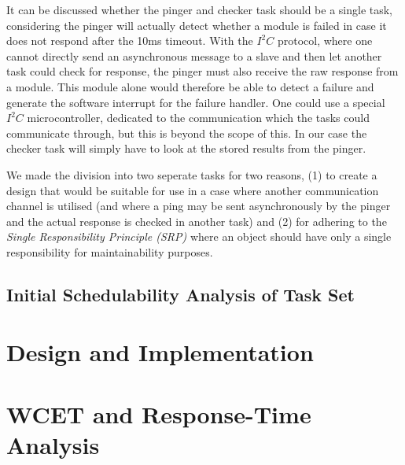 It can be discussed whether the pinger and checker task should be a single task, considering the pinger will actually detect whether a module is failed in case it does not respond after the 10ms timeout. With the $\textit{I}^2\textit{C}$ protocol, where one cannot directly send an asynchronous message to a slave and then let another task could check for response, the pinger must also receive the raw response from a module. This module alone would therefore be able to detect a failure and generate the software interrupt for the failure handler. One could use a special $\textit{I}^2\textit{C}$ microcontroller, dedicated to the communication which the tasks could communicate through, but this is beyond the scope of this. In our case the checker task will simply have to look at the stored results from the pinger.

We made the division into two seperate tasks for two reasons, (1) to create a design that would be suitable for use in a case where another communication channel is utilised (and where a ping may be sent asynchronously by the pinger and the actual response is checked in another task) and (2) for adhering to the \textit{Single Responsibility Principle (SRP)} where an object should have only a single responsibility for maintainability purposes.

\section{Initial Schedulability Analysis of Task Set}

\chapter{Design and Implementation}

\chapter{WCET and Response-Time Analysis}
\label{chapter:wcetrta}

